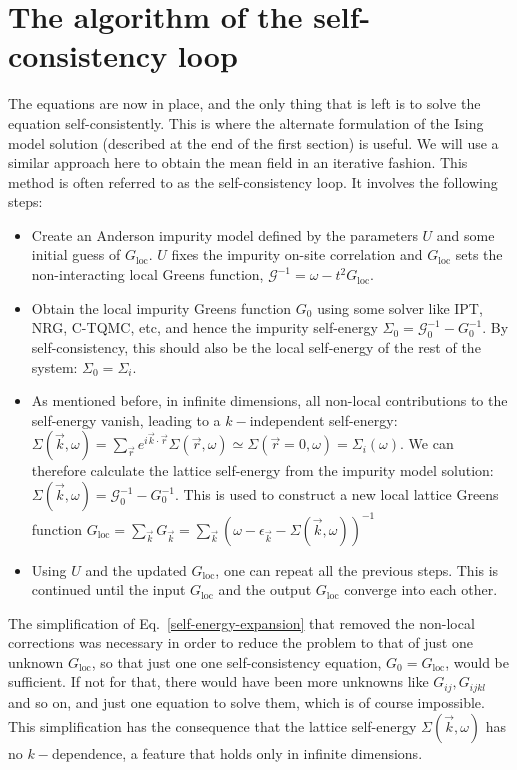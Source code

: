 \documentclass[12pt,onecolumn]{revtex4-2}
\begin{document}
\section{The algorithm of the self-consistency loop}
The equations are now in place, and the only thing that is left is to solve the equation self-consistently. This is where the alternate formulation of the Ising model solution (described at the end of the first section) is useful. We will use a similar approach here to obtain the mean field in an iterative fashion. This method is often referred to as the self-consistency loop. It involves the following steps:
\begin{itemize}
	\item Create an Anderson impurity model defined by the parameters \(U\) and some initial guess of \(G_\text{loc}\). \(U\) fixes the impurity on-site correlation and \(G_\text{loc}\) sets the non-interacting local Greens function, \(\mathcal{G}^{-1} = \omega - t^2 G_\text{loc}\).
	\item Obtain the local impurity Greens function \(G_0\) using some solver like IPT, NRG, C-TQMC, etc, and hence the impurity self-energy \(\Sigma_0 = \mathcal{G}_0^{-1} - G_0^{-1}\). By self-consistency, this should also be the local self-energy of the rest of the system: \(\Sigma_0 = \Sigma_i\).
	\item As mentioned before, in infinite dimensions, all non-local contributions to the self-energy vanish, leading to a \(k-\)independent self-energy: \(\Sigma(\vec k,\omega) = \sum_{\vec r}e^{i \vec{k}\cdot\vec{r}}\Sigma(\vec r,\omega) \simeq \Sigma(\vec r=0, \omega) = \Sigma_i(\omega)\). We can therefore calculate the lattice self-energy from the impurity model solution: \(\Sigma(\vec k,\omega) = \mathcal{G}_0^{-1} - G_0^{-1}\). This is used to construct a new local lattice Greens function \(G_\text{loc} = \sum_{\vec k} G_{\vec k} = \sum_{\vec k} \left(\omega - \epsilon_{\vec k} - \Sigma(\vec k,\omega)\right)^{-1} \)
	\item Using \(U\) and the updated \(G_\text{loc}\), one can repeat all the previous steps. This is continued until the input \(G_\text{loc}\) and the output \(G_\text{loc}\) converge into each other.
\end{itemize}
The simplification of Eq.~\ref{self-energy-expansion} that removed the non-local corrections was necessary in order to reduce the problem to that of just one unknown \(G_\text{loc}\), so that just one one self-consistency equation, \(G_0 = G_\text{loc}\), would be sufficient. If not for that, there would have been more unknowns like \(G_{ij}, G_{ijkl}\) and so on, and just one equation to solve them, which is of course impossible. This simplification has the consequence that the lattice self-energy \(\Sigma(\vec k,\omega)\) has no \(k-\)dependence, a feature that holds only in infinite dimensions.
\end{document}
